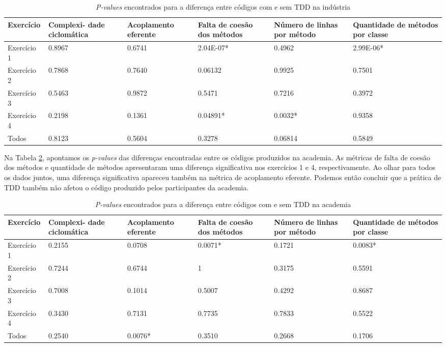 \begin{table}[h!]
	\centering
	\begin{tabular}{ | p{3cm} | p{2cm} | p{2cm} | p{2cm} | p{2cm} | p{2cm} |}
		\hline
		Exercício & Complexi- dade ciclomática & Acoplamento eferente & Falta de coesão dos métodos & Número de linhas por método 
		& Quantidade de métodos por classe \\
		\hline
		Exercício 1 &	0.8967	&	0.6741 &	\cellcolor[gray]{0.8}2.04E-07* &	0.4962 &	\cellcolor[gray]{0.8}2.99E-06* \\
		Exercício 2	& 0.7868	&	0.7640 &	0.06132 &	0.9925 &	0.7501 \\
		Exercício 3	& 0.5463	&	0.9872 &	0.5471 &	0.7216 &	0.3972\\
		Exercício 4	& 0.2198	&	0.1361 &	\cellcolor[gray]{0.8}0.04891* &	\cellcolor[gray]{0.8}0.0032* &	0.9358\\
		\hline
		Todos &	0.8123	&	0.5604 &	0.3278 &	0.06814 &	0.5849\\
		\hline
	\end{tabular}
	\caption{\textit{P-values} encontrados para a diferença entre códigos com e sem TDD na indústria}
	\label{metricas-industria}
\end{table}

Na Tabela \ref{metricas-academia}, apontamos os \textit{p-values} das diferenças encontradas
entre os códigos produzidos na academia. As métricas de 
falta de coesão dos métodos e quantidade de métodos apresentaram
uma diferença significativa nos exercícios 1 e 4, respectivamente.
Ao olhar para todos os dados juntos, uma diferença significativa
apareceu também na métrica de acoplamento eferente.
Podemos então concluir que a prática de TDD também não afetou
o código produzido pelos participantes da academia.

\begin{table}[h!]
	\centering
	\begin{tabular}{ | p{3cm} | p{2cm} | p{2cm} | p{2cm} | p{2cm} | p{2cm} |}
		\hline
		Exercício & Complexi- dade ciclomática & Acoplamento eferente & Falta de coesão dos métodos & Número de linhas por método 
		& Quantidade de métodos por classe \\
		\hline
			Exercício 1	& 0.2155	&	0.0708	& \cellcolor[gray]{0.8}0.0071* &	0.1721	& \cellcolor[gray]{0.8}0.0083*\\
			Exercício 2	& 0.7244	&	0.6744	& 1 &	0.3175 &	0.5591\\
			Exercício 3	& 0.7008	&	0.1014 &	0.5007	& 0.4292	& 0.8687\\
			Exercício 4	& 0.3430	&	0.7131 &	0.7735	& 0.7833	& 0.5522\\
		\hline
			Todos &	0.2540	&	\cellcolor[gray]{0.8}0.0076* & 0.3510 & 0.2668 & 0.1706\\
		\hline
	\end{tabular}
	\caption{\textit{P-values} encontrados para a diferença entre códigos com e sem TDD na academia}
	\label{metricas-academia}
\end{table}

